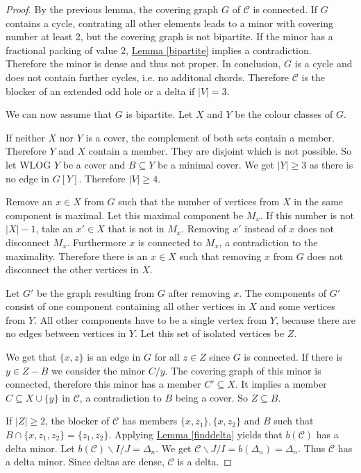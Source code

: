 \documentclass[a4paper, 12pt]{scrbook}
\theoremstyle{definition}
\begin{document}
   \begin{proof}
       By the previous lemma, the covering graph $G$ of $\mathcal{C}$ is connected.
       If $G$ contains a cycle, contrating all other elements leads to a minor with covering number at least 2, but the covering graph is not bipartite.
       If the minor has a fractional packing of value 2, \hyperref[bipartite]{Lemma \ref*{bipartite}} implies a contradiction. Therefore the minor is dense and thus not proper.
       In conclusion, $G$ is a cycle and does not contain further cycles, i.e. no additonal chords.
       Therefore $\mathcal{C}$ is the blocker of an extended odd hole or a delta if $|V|=3$.

       We can now assume that $G$ is bipartite.
       Let $X$ and $Y$ be the colour classes of $G$.

       If neither $X$ nor $Y$ is a cover, the complement of both sets contain a member. Therefore $Y$ and $X$ contain a member. They are disjoint which is not possible.
       So let WLOG $Y$ be a cover and $B \subseteq Y$ be a minimal cover.
       We get $|Y|\geq 3$ as there is no edge in $G[Y]$.
       Therefore $|V|\geq 4$.

       Remove an $x \in X$ from $G$ such that the number of vertices from $X$ in the same component is maximal.
       Let this maximal component be $M_x$.
       If this number is not $|X|-1$, take an $x' \in X$ that is not in $M_x$.
       Removing $x'$ instead of $x$ does not disconnect $M_x$. Furthermore $x$ is connected to $M_x$, a contradiction to the maximality.
       Therefore there is an $x \in X$ such that removing $x$ from $G$ does not disconnect the other vertices in $X$.

       Let $G'$ be the graph resulting from $G$ after removing $x$.
       The components of $G'$ consist of one component containing all other vertices in $X$ and some vertices from $Y$.
       All other components have to be a single vertex from $Y$, because there are no edges between vertices in $Y$.
       Let this set of isolated vertices be $Z$.

       We get that $\{x,z\}$ is an edge in $G$ for all $z \in Z$ since $G$ is connected.
       If there is $y \in Z-B$ we consider the minor $C / y$.
       The covering graph of this minor is connected, therefore this minor has a member $C' \subseteq X$. It implies a member $C \subseteq X \cup \{y\}$ in $\mathcal{C}$, a contradiction to $B$ being a cover. So $Z \subseteq B$.

       If $|Z|\geq 2$, the blocker of $\mathcal{C}$ has members $\{x,z_1\},\{x,z_2\}$ and $B$ such that $B \cap \{x,z_1,z_2\}=\{z_1,z_2\}$. Applying \hyperref[finddelta]{Lemma \ref*{finddelta}} yields that $b(\mathcal{C})$ has a delta minor. Let $b(\mathcal{C})\backslash I /J=\Delta_n$. We get $\mathcal{C} \backslash J / I = b(\Delta_n)=\Delta_n$.
       Thus $\mathcal{C}$ has a delta minor. Since deltas are dense, $\mathcal{C}$ is a delta.


\end{proof}
\end{document}
